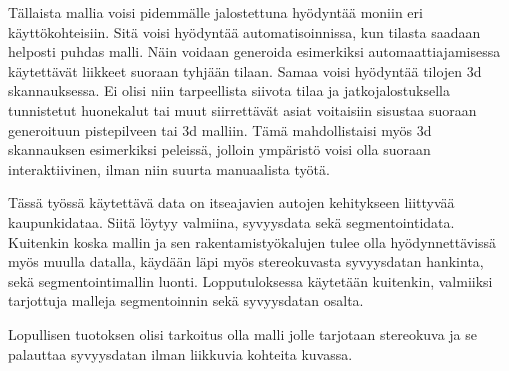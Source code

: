 Tällaista mallia voisi pidemmälle jalostettuna hyödyntää moniin eri käyttökohteisiin.
Sitä voisi hyödyntää automatisoinnissa, kun tilasta saadaan helposti puhdas malli.
Näin voidaan generoida esimerkiksi automaattiajamisessa käytettävät liikkeet suoraan tyhjään tilaan.
Samaa voisi hyödyntää tilojen 3d skannauksessa.
Ei olisi niin tarpeellista siivota tilaa ja jatkojalostuksella tunnistetut huonekalut tai muut siirrettävät asiat voitaisiin sisustaa suoraan generoituun pistepilveen tai 3d malliin.
Tämä mahdollistaisi myös 3d skannauksen esimerkiksi peleissä,
jolloin ympäristö voisi olla suoraan interaktiivinen,
ilman niin suurta manuaalista työtä. 

Tässä työssä käytettävä data on itseajavien autojen kehitykseen liittyvää kaupunkidataa. 
Siitä löytyy valmiina, syvyysdata sekä segmentointidata.
Kuitenkin koska mallin ja sen rakentamistyökalujen tulee olla hyödynnettävissä myös muulla datalla,
käydään läpi myös stereokuvasta syvyysdatan hankinta,
sekä segmentointimallin luonti. Lopputuloksessa käytetään kuitenkin,
valmiiksi tarjottuja malleja segmentoinnin sekä syvyysdatan osalta.

Lopullisen tuotoksen olisi tarkoitus olla malli jolle tarjotaan stereokuva ja se palauttaa syvyysdatan ilman liikkuvia kohteita kuvassa.
